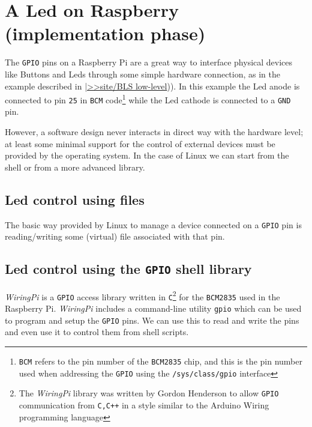 \section{A Led on Raspberry (implementation phase)}
The \texttt{GPIO} pins on a Raspberry Pi are a great way to interface physical devices like Buttons and Leds through some simple hardware connection, as in the example described in
\href{https://137.204.107.21/syskb/it.unibo.iss2015intro/docs/Appls/ButtonLed/buttonLedLowLevel.html}{|>>site/BLS low-level})). In this example the Led anode  is connected to pin \texttt{25} in \texttt{BCM} code\footnote{\texttt{BCM} refers to the pin number of the \texttt{BCM2835} chip, and this is the pin number used when addressing the \texttt{GPIO} using the \texttt{/sys/class/gpio} interface}  while the Led cathode is connected to a \texttt{GND} pin.

However, a software design never interacts in direct way with the hardware level; at least some minimal support for the control of external devices must be provided by the operating system. In the case of Linux we can start from the shell or from a more advanced library.


\subsection{Led control using files}
The basic way provided by Linux to manage a device connected on a \texttt{GPIO} pin is reading/writing some (virtual) file associated with that pin.



\subsection{Led control using the \texttt{GPIO} shell library}
\textit{WiringPi} is a \texttt{GPIO} access library written in \texttt{C}\footnote{The \textit{WiringPi}  library was written by Gordon Henderson to allow \texttt{GPIO} communication from \texttt{C,C++} in a style similar to the Arduino Wiring programming language} for the \texttt{BCM2835} used in the Raspberry Pi. \textit{WiringPi} includes a command-line utility \texttt{gpio} which can be used to program and setup the \texttt{GPIO} pins. We can use this to read and write the pins and even use it to control them from shell scripts.

